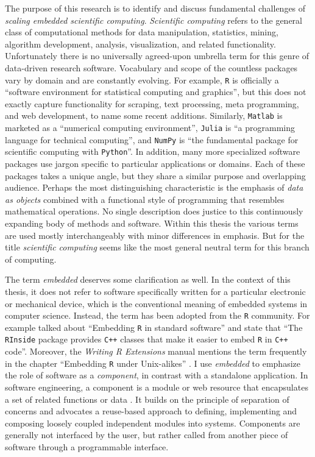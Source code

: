 The purpose of this research is to identify and discuss fundamental challenges of \emph{scaling embedded scientific computing}. \emph{Scientific computing} refers to the general class of computational methods for data manipulation, statistics, mining, algorithm development, analysis, visualization, and related functionality. Unfortunately there is no universally agreed-upon umbrella term for this genre of data-driven research software. Vocabulary and scope of the countless packages vary by domain and are constantly evolving. For example, \texttt{R} is officially a ``software environment for statistical computing and graphics'', but this does not exactly capture functionality for scraping, text processing, meta programming, and web development, to name some recent additions. Similarly, \texttt{Matlab} is marketed as a ``numerical computing environment'', \texttt{Julia} is ``a programming language for technical computing'', and \texttt{NumPy} is ``the fundamental package for scientific computing with \texttt{Python}''. In addition, many more specialized software packages use jargon specific to particular applications or domains. Each of these packages takes a unique angle, but they share a similar purpose and overlapping audience. Perhaps the most distinguishing characteristic is the emphasis of \emph{data as objects} combined with a functional style of programming that resembles mathematical operations. No single description does justice to this continuously expanding body of methods and software. Within this thesis the various terms are used mostly interchangeably with minor differences in emphasis. But for the title \emph{scientific computing} seems like the most general neutral term for this branch of computing.

The term \emph{embedded} deserves some clarification as well. In the context of this thesis, it does not refer to software specifically written for a particular electronic or mechanical device, which is the conventional meaning of embedded systems in computer science. Instead, the term has been adopted from the \texttt{R} community. For example \cite{neuwirth2001embedding} talked about ``Embedding \texttt{R} in standard software'' and \cite{eddelbuettel2011rcpp} state that ``The \texttt{RInside} package provides \texttt{C++} classes that make it easier to embed \texttt{R} in \texttt{C++} code''. Moreover, the \emph{Writing R Extensions} manual mentions the term frequently in the chapter ``Embedding \texttt{R} under Unix-alikes'' \citep{writingextensions}. I use \emph{embedded} to emphasize the role of software as a \emph{component}, in contrast with a standalone application. In software engineering, a component is a module or web resource that encapsulates a set of related functions or data \citep{cox1990planning}. It builds on the principle of separation of concerns and advocates a reuse-based approach to defining, implementing and composing loosely coupled independent modules into systems. Components are generally not interfaced by the user, but rather called from another piece of software through a programmable interface. %

